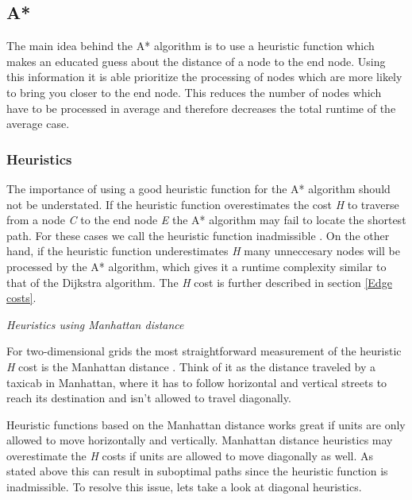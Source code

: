 \documentclass[12pt, a4paper]{article}
\begin{document}



\subsection{A*}


The main idea behind the A* algorithm is to use a heuristic function which makes
an educated guess about the distance of a node to the end node. Using this
information it is able prioritize the processing of nodes which are more likely
to bring you closer to the end node. This reduces the number of nodes which have
to be processed in average and therefore decreases the total runtime of the
average case.


\subsubsection{Heuristics}
\label{Heuristics}

The importance of using a good heuristic function for the A* algorithm should
not be understated. If the heuristic function overestimates the cost \textit{H}
to traverse from a node \textit{C} to the end node \textit{E} the A* algorithm
may fail to locate the shortest path. For these cases we call the heuristic
function inadmissible \cite{astar2}. On the other hand, if the heuristic
function underestimates \textit{H} many unneccesary nodes will be processed by
the A* algorithm, which gives it a runtime complexity similar to that of the
Dijkstra algorithm. The \textit{H} cost is further described in section
\ref{Edge costs}.

\textit{Heuristics using Manhattan distance}

For two-dimensional grids the most straightforward measurement of the heuristic
\textit{H} cost is the Manhattan distance \cite{manhattan}. Think of it as the
distance traveled by a taxicab in Manhattan, where it has to follow horizontal
and vertical streets to reach its destination and isn't allowed to travel
diagonally.

Heuristic functions based on the Manhattan distance works great if units are
only allowed to move horizontally and vertically. Manhattan distance heuristics
may overestimate the \textit{H} costs if units are allowed to move diagonally as
well. As stated above this can result in suboptimal paths since the heuristic
function is inadmissible. To resolve this issue, lets take a look at diagonal
heuristics.
\end{document}
